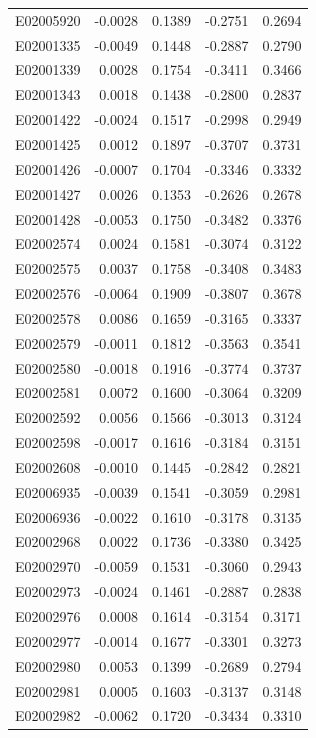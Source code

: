 \documentclass[11pt, a4paper]{article}
\begin{document}
\begin{longtable}{lrrrr}
E02005920 & -0.0028 & 0.1389 & -0.2751 & 0.2694 \\
E02001335 & -0.0049 & 0.1448 & -0.2887 & 0.2790 \\
E02001339 & 0.0028 & 0.1754 & -0.3411 & 0.3466 \\
E02001343 & 0.0018 & 0.1438 & -0.2800 & 0.2837 \\
E02001422 & -0.0024 & 0.1517 & -0.2998 & 0.2949 \\
E02001425 & 0.0012 & 0.1897 & -0.3707 & 0.3731 \\
E02001426 & -0.0007 & 0.1704 & -0.3346 & 0.3332 \\
E02001427 & 0.0026 & 0.1353 & -0.2626 & 0.2678 \\
E02001428 & -0.0053 & 0.1750 & -0.3482 & 0.3376 \\
E02002574 & 0.0024 & 0.1581 & -0.3074 & 0.3122 \\
E02002575 & 0.0037 & 0.1758 & -0.3408 & 0.3483 \\
E02002576 & -0.0064 & 0.1909 & -0.3807 & 0.3678 \\
E02002578 & 0.0086 & 0.1659 & -0.3165 & 0.3337 \\
E02002579 & -0.0011 & 0.1812 & -0.3563 & 0.3541 \\
E02002580 & -0.0018 & 0.1916 & -0.3774 & 0.3737 \\
E02002581 & 0.0072 & 0.1600 & -0.3064 & 0.3209 \\
E02002592 & 0.0056 & 0.1566 & -0.3013 & 0.3124 \\
E02002598 & -0.0017 & 0.1616 & -0.3184 & 0.3151 \\
E02002608 & -0.0010 & 0.1445 & -0.2842 & 0.2821 \\
E02006935 & -0.0039 & 0.1541 & -0.3059 & 0.2981 \\
E02006936 & -0.0022 & 0.1610 & -0.3178 & 0.3135 \\
E02002968 & 0.0022 & 0.1736 & -0.3380 & 0.3425 \\
E02002970 & -0.0059 & 0.1531 & -0.3060 & 0.2943 \\
E02002973 & -0.0024 & 0.1461 & -0.2887 & 0.2838 \\
E02002976 & 0.0008 & 0.1614 & -0.3154 & 0.3171 \\
E02002977 & -0.0014 & 0.1677 & -0.3301 & 0.3273 \\
E02002980 & 0.0053 & 0.1399 & -0.2689 & 0.2794 \\
E02002981 & 0.0005 & 0.1603 & -0.3137 & 0.3148 \\
E02002982 & -0.0062 & 0.1720 & -0.3434 & 0.3310 \\

\end{longtable}
\end{document}
